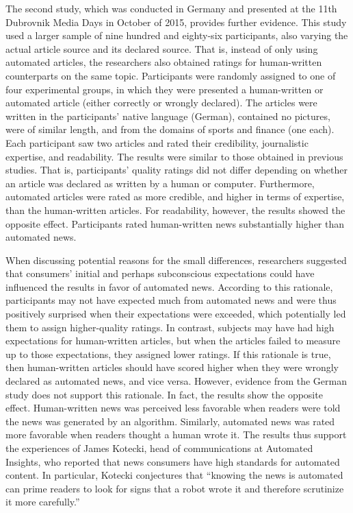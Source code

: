 \documentclass[notoc, symmetric, nobib, nols]{towcenter-guideto-book}
\begin{document}
\begin{framed}
The second study, which was conducted in Germany and presented at the 11th Dubrovnik Media Days in October of 2015, provides further evidence.\autocite{graefe15} This study used a larger sample of nine hundred and eighty-six participants, also varying the actual article source and its declared source. That is, instead of only using automated articles, the researchers also obtained ratings for human-written counterparts on the same topic. Participants were randomly assigned to one of four experimental groups, in which they were presented a human-written or automated article (either correctly or wrongly declared). The articles were written in the participants' native language (German), contained no pictures, were of similar length, and from the domains of sports and finance (one each). Each participant saw two articles and rated their credibility, journalistic expertise, and readability. The results were similar to those obtained in previous studies. That is, participants' quality ratings did not differ depending on whether an article was declared as written by a human or computer. Furthermore, automated articles were rated as more credible, and higher in terms of expertise, than the human-written articles. For readability, however, the results showed the opposite effect. Participants rated human-written news substantially higher than automated news.
\end{framed}

When discussing potential reasons for the small differences, researchers suggested that consumers' initial and perhaps subconscious expectations could have influenced the results in favor of automated news.\autocite{kaa14} According to this rationale, participants may not have expected much from automated news and were thus positively surprised when their expectations were exceeded, which potentially led them to assign higher-quality ratings. In contrast, subjects may have had high expectations for human-written articles, but when the articles failed to measure up to those expectations, they assigned lower ratings. If this rationale is true, then human-written articles should have scored higher when they were wrongly declared as automated news, and vice versa. However, evidence from the German study does not support this rationale.\autocite{graefe15} In fact, the results show the opposite effect. Human-written news was perceived less favorable when readers were told the news was generated by an algorithm. Similarly, automated news was rated more favorable when readers thought a human wrote it. The results thus support the experiences of James Kotecki, head of communications at Automated Insights, who reported that news consumers have high standards for automated content. In particular, Kotecki conjectures that ``knowing the news is automated can prime readers to look for signs that a robot wrote it and therefore scrutinize it more carefully.''
\end{document}
